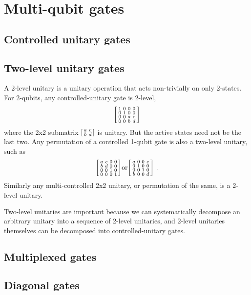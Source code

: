

\clearpage

\section{Multi-qubit gates}

\subsection{Controlled unitary gates}

\subsection{Two-level unitary gates}

A 2-level unitary is a unitary operation that acts non-trivially on only 2-states. For 2-qubits, any controlled-unitary gate is 2-level,
\[
\begin{bsmallmatrix}
    1 & 0 & 0 & 0 \\ 
    0 & 1 & 0 & 0 \\ 
    0 & 0 & a & c \\ 
    0 & 0 & b & d        
\end{bsmallmatrix}
\]
where the 2x2 submatrix $\begin{bsmallmatrix}
    a & c \\ 
    b & d        
\end{bsmallmatrix}$ 
is unitary. But the active states need not be the last two. Any permutation of a controlled 1-qubit gate is also a two-level unitary, such as 
\[
\begin{bsmallmatrix}
    a & c & 0 & 0 \\ 
    b & d & 0 & 0 \\ 
    0 & 0 & 1 & 0 \\ 
    0 & 0 & 0 & 1        
\end{bsmallmatrix}
\text{or}
\begin{bsmallmatrix}
    a & 0 & 0 & c \\ 
    0 & 1 & 0 & 0 \\ 
    0 & 0 & 1 & 0 \\ 
    b & 0 & 0 & d        
\end{bsmallmatrix} \ .
\]
Similarly any multi-controlled 2x2 unitary, or permutation of the same, is a 2-level unitary. 

Two-level unitaries are important because we can systematically decompose an arbitrary unitary into a sequence of 2-level unitaries, and 2-level unitaries themselves can be decomposed into controlled-unitary gates. 

\subsection{Multiplexed gates}

\subsection{Diagonal gates}


